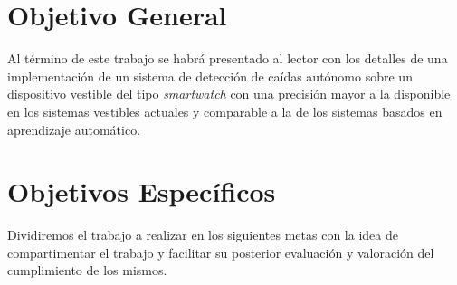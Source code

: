 \iffalse
Puente entre el estudio y la contribución. Debe contener:
 * objetivo general
 * objetivo específico
 * metodología de trabajo
 
Los objetivos deben ser \textit{SMART}

Specificl (objetivo claro)
Measurable (se pueda medir el éxito o fracaso)
Attainable (viable su conecución con el tiempo y recursos disponibles)
Relevant (que tenga un impacto demostrable)
Time-related (que se pueda realizar en un tiempo determinado)

Objetivos secundarios:
Conjunto de objetivos más específicos alcanzables por separado. suelen ser los diferentes pasos a seguir para conseguir el objetivo general. Han de ser smart, los verbos deberían ser:     • Analizar
Calcular
Clasificar
Comparar
Conocer
Cuantificar
Desarrollar
Describir
Descubrir
Determinar
Establecer
Explorar
Identificar
Indagar
Medir
Sintetizar
Verificar

Objetivo general
Un poco la descripción a grandes rasgos de qué se espera explicado al público general.
Ejemplo: Mejorar el servicio de audio gruía de un museo con una guía interactiva por voz valorada positivamente con un 4/5 al menos.

\fi

\section{Objetivo General}\label{sec:obj:objetivo_general}
Al término de este trabajo se habrá presentado al lector con los detalles de una implementación de un sistema de detección de caídas autónomo sobre un dispositivo vestible del tipo \textit{smartwatch} con una precisión mayor a la disponible en los sistemas vestibles actuales y comparable a la de los sistemas basados en aprendizaje automático.

\section{Objetivos Específicos}\label{sec:obj:objetivos_especificos}
Dividiremos el trabajo a realizar en los siguientes metas con la idea de compartimentar el trabajo y facilitar su posterior evaluación y valoración del cumplimiento de los mismos.

